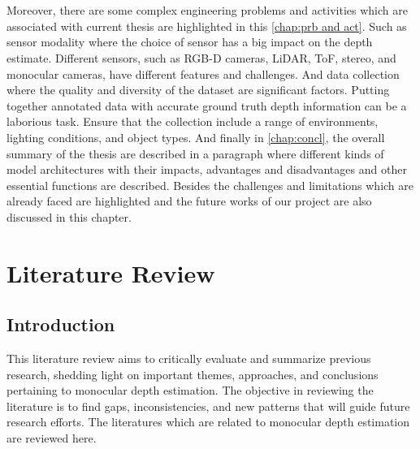 \documentclass[a4paper,12pt,oneside]{book}
\begin{document}
\\\\
Moreover, there are some complex engineering problems and activities which are associated with current thesis are highlighted in this \autoref{chap:prb and act}. Such as sensor modality where the choice of sensor has a big impact on the depth estimate. Different sensors, such as RGB-D cameras, LiDAR, ToF, stereo, and monocular cameras, have different features and challenges. And data collection where the quality and diversity of the dataset are significant factors. Putting together annotated data with accurate ground truth depth information can be a laborious task. Ensure that the collection include a range of environments, lighting conditions, and object types. 
And finally in \autoref{chap:concl}, the overall summary of the thesis are described in a paragraph where different kinds of model architectures with their impacts, advantages and disadvantages and other essential functions are described. Besides the challenges and limitations which are already faced are highlighted and the future works of our project are also discussed in this chapter.

\chapter{\textbf{Literature Review}}\label{chap:lit_review}
\section{Introduction}This literature review aims to critically evaluate and summarize previous research, shedding light on important themes, approaches, and conclusions pertaining to monocular depth estimation. The objective in reviewing the literature is to find gaps, inconsistencies, and new patterns that will guide future research efforts.
The literatures which are related to monocular depth estimation are reviewed here.
\end{document}

